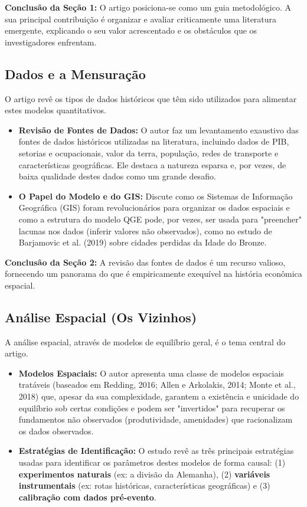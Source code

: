 \documentclass[12pt, a4paper]{article}
\begin{document}
\noindent\textbf{Conclusão da Seção 1:} O artigo posiciona-se como um guia metodológico. A sua principal contribuição é organizar e avaliar criticamente uma literatura emergente, explicando o seu valor acrescentado e os obstáculos que os investigadores enfrentam.

\subsection{Dados e a Mensuração}
O artigo revê os tipos de dados históricos que têm sido utilizados para alimentar estes modelos quantitativos.
\begin{itemize}
    \item \textbf{Revisão de Fontes de Dados:} O autor faz um levantamento exaustivo das fontes de dados históricos utilizadas na literatura, incluindo dados de PIB, setorias e ocupacionais, valor da terra, população, redes de transporte e características geográficas. Ele destaca a natureza esparsa e, por vezes, de baixa qualidade destes dados como um grande desafio.
    \item \textbf{O Papel do Modelo e do GIS:} Discute como os Sistemas de Informação Geográfica (GIS) foram revolucionários para organizar os dados espaciais e como a estrutura do modelo QGE pode, por vezes, ser usada para "preencher" lacunas nos dados (inferir valores não observados), como no estudo de Barjamovic et al. (2019) sobre cidades perdidas da Idade do Bronze.
\end{itemize}

\noindent\textbf{Conclusão da Seção 2:} A revisão das fontes de dados é um recurso valioso, fornecendo um panorama do que é empiricamente exequível na história econômica espacial.

\subsection{Análise Espacial (Os Vizinhos)}
A análise espacial, através de modelos de equilíbrio geral, é o tema central do artigo.
\begin{itemize}
    \item \textbf{Modelos Espaciais:} O autor apresenta uma classe de modelos espaciais tratáveis (baseados em Redding, 2016; Allen e Arkolakis, 2014; Monte et al., 2018) que, apesar da sua complexidade, garantem a existência e unicidade do equilíbrio sob certas condições e podem ser "invertidos" para recuperar os fundamentos não observados (produtividade, amenidades) que racionalizam os dados observados.
    \item \textbf{Estratégias de Identificação:} O estudo revê as três principais estratégias usadas para identificar os parâmetros destes modelos de forma causal: (1) \textbf{experimentos naturais} (ex: a divisão da Alemanha), (2) \textbf{variáveis instrumentais} (ex: rotas históricas, características geográficas) e (3) \textbf{calibração com dados pré-evento}.
\end{itemize}
\end{document}
